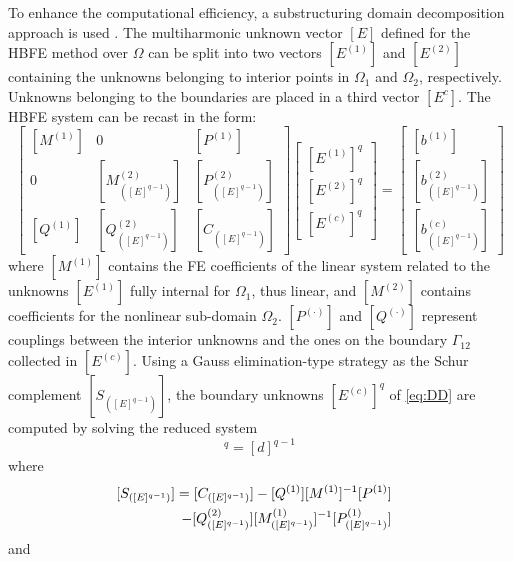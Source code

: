 \documentclass[journal]{IEEEtran}
\begin{document}
\par To enhance the computational efficiency, a substructuring domain decomposition approach is used \cite{Toselli2005, Guarnieri2009, Guarnieri2010, Saad2000}. The multiharmonic unknown vector $[E]$ defined for the HBFE method over $\Omega$ can be split into two vectors $[E^{(1)}]$ and $[E^{(2)}]$
containing the unknowns belonging to interior points in $\Omega_1$ and $\Omega_2$, respectively. Unknowns belonging to the boundaries are placed in a third vector $[E^c]$. The HBFE system can be recast in the form:
\begin{equation}\label{eq:DD}
\scriptstyle
\left [ \begin{array}{cccccc}
\scriptstyle [M^{(1)}] & \scriptstyle 0  &  \scriptstyle[P^{(1)}] \\
\scriptstyle 0  &  \scriptstyle[M_{([E]^{q-1})}^{(2)}] & \scriptstyle[P_{([E]^{q-1})}^{(2)}] \\
\scriptstyle{[Q^{(1)}]} & \scriptstyle{[Q_{([E]^{q-1})}^{(2)}]} & \scriptstyle{[C_{([E]^{q-1})}]}
\end{array} \right ]
\left [ \begin{array}{cc}
\scriptstyle{[E^{(1)}]^{q}} \\
\scriptstyle{[E^{(2)}]^{q}} \\
\scriptstyle{[E^{(c)}]^{q}}
\end{array} \right ] = \left [ \begin{array}{cc}
\scriptstyle{[b^{(1)}]} \\
\scriptstyle{[b_{([E]^{q-1})}^{(2)}]} \\
\scriptstyle{[b_{([E]^{q-1})}^{(c)}]}
\end{array} \right ] 
\end{equation}
where $[M^{(1)}]$ contains the FE coefficients of the linear system related to the unknowns $[E^{(1)}]$ fully internal for $\Omega_1$, thus linear, and $[M^{(2)}]$ contains coefficients for the nonlinear sub-domain $\Omega_2$. ${[P^{(\cdot)}]}$ and ${[Q^{(\cdot)}]}$ represent couplings between the interior unknowns and the ones on the boundary $\Gamma_{12}$ collected in $[E^{(c)}]$. Using a Gauss elimination-type strategy as the Schur complement $[S_{([E]^{q-1})}]$, the boundary unknowns $[E^{(c)}]^{q}$ of \eqref{eq:DD} are computed by solving the reduced system
\begin{equation}
[S_{([E]^{q-1})}] [E^{(c)}]^{q} = [d]^{q-1} 
\end{equation} where
\begin{eqnarray}
\label{eq:shurS}
& & \hspace{-1cm} [S_{([E]^{q-1})}] = [C_{([E]^{q-1})}] - [Q^{(1)}][M^{(1)}]^{-1} [P^{(1)}] \nonumber \\
& & \hspace{1cm}- [Q_{([E]^{q-1})}^{(2)}][M_{([E]^{q-1})}^{(1)}]^{-1} [P_{([E]^{q-1})}^{(1)}]
\end{eqnarray} and
\end{document}
